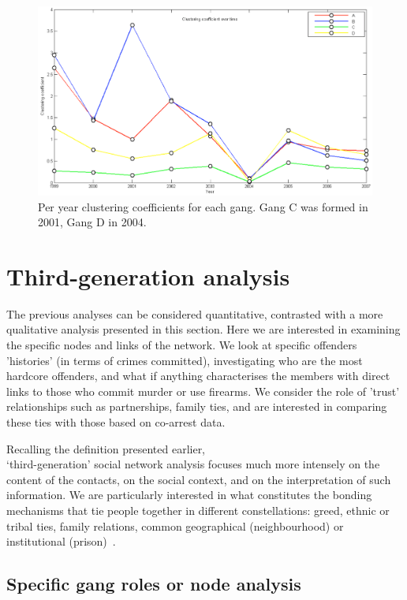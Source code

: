\documentclass[twocolumn]{svjour3}          %
\theoremstyle{definition}
\begin{document}
\begin{figure}[!ht]
\centering
\includegraphics[width=\columnwidth]{images/gangscc1years}
\caption{Per year clustering coefficients for each gang. Gang C was formed in 2001, Gang D in 2004.} 
\label{fig:gangscc1years}
\end{figure}



\section{Third-generation analysis}\label{sec:thirdanalysis}

The previous analyses can be considered quantitative, contrasted with
a more qualitative analysis presented in this section. Here we are
interested in examining the specific nodes and links of the
network. We look at specific offenders 'histories' (in terms of crimes
committed), investigating who are the most hardcore offenders, and
what if anything characterises the members with direct links to those
who commit murder or use firearms. We consider the role of 'trust'
relationships such as partnerships, family ties, and are interested in
comparing these ties with those based on co-arrest data.

Recalling the definition presented earlier,\\`third-generation' social
network analysis focuses much more intensely on the content of the
contacts, on the social context, and on the interpretation of such
information. We are particularly interested in what constitutes the
bonding mechanisms that tie people together in different
constellations: greed, ethnic or tribal ties, family relations, common
geographical (neighbourhood) or institutional
(prison)~\citep{Klerks2001}.


\subsection{Specific gang roles or node analysis}\label{sec:shortestpaths}
\end{document}
